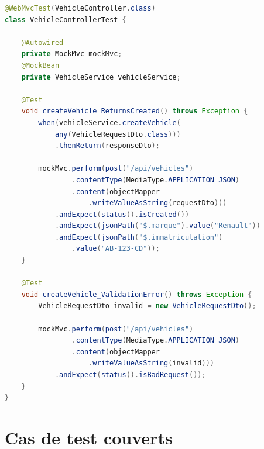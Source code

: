 \documentclass[12pt,a4paper]{report}
\begin{document}
\begin{lstlisting}[style=javastyle, language=Java, caption={Extrait de VehicleControllerTest.java}]
@WebMvcTest(VehicleController.class)
class VehicleControllerTest {

    @Autowired
    private MockMvc mockMvc;
    @MockBean
    private VehicleService vehicleService;

    @Test
    void createVehicle_ReturnsCreated() throws Exception {
        when(vehicleService.createVehicle(
            any(VehicleRequestDto.class)))
            .thenReturn(responseDto);

        mockMvc.perform(post("/api/vehicles")
                .contentType(MediaType.APPLICATION_JSON)
                .content(objectMapper
                    .writeValueAsString(requestDto)))
            .andExpect(status().isCreated())
            .andExpect(jsonPath("$.marque").value("Renault"))
            .andExpect(jsonPath("$.immatriculation")
                .value("AB-123-CD"));
    }

    @Test
    void createVehicle_ValidationError() throws Exception {
        VehicleRequestDto invalid = new VehicleRequestDto();

        mockMvc.perform(post("/api/vehicles")
                .contentType(MediaType.APPLICATION_JSON)
                .content(objectMapper
                    .writeValueAsString(invalid)))
            .andExpect(status().isBadRequest());
    }
}
\end{lstlisting}

\section{Cas de test couverts}
\end{document}
